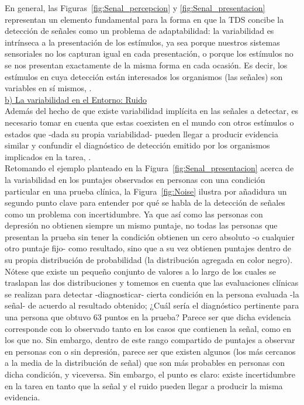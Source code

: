 En general, las Figuras~\ref{fig:Senal_percepcion} y \ref{fig:Senal_presentacion} representan un elemento fundamental para la forma en que la TDS concibe la detección de señales como un problema de adaptabilidad: la variabilidad es intrínseca a la presentación de los estímulos, ya sea porque nuestros sistemas sensoriales no los capturan igual en cada presentación, o porque los estímulos no se nos presentan exactamente de la misma forma en cada ocasión. Es decir, los estímulos en cuya detección están interesados los organismos (las señales) son variables en sí mismos, \parencite{Tanner1954}.\\

    \underline{b) La variabilidad en el Entorno: Ruido}\\

Además del hecho de que existe variabilidad implícita en las señales a detectar, es necesario tomar en cuenta que estas coexisten en el mundo con otros estímulos o estados que -dada su propia variabilidad- pueden llegar a producir evidencia similar y confundir el diagnóstico de detección emitido por los organismos implicados en la tarea, \parencite{Tanner1954}.\\

Retomando el ejemplo planteado en la Figura~\ref{fig:Senal_presentacion} acerca de la variabilidad en los puntajes observados en personas con una condición particular en una prueba clínica, la Figura~\ref{fig:Noise} ilustra por añadidura un segundo punto clave para entender por qué se habla de la detección de señales como un problema con incertidumbre. Ya que así como las personas con depresión no obtienen siempre un mismo puntaje, no todas las personas que presentan la prueba sin tener la condición obtienen un cero absoluto -o cualquier otro puntaje fijo- como resultado, sino que a su vez obtienen puntajes dentro de su propia distribución de probabilidad (la distribución agregada en color negro). Nótese que existe un pequeño conjunto de valores a lo largo de los cuales se traslapan las dos distribuciones y tomemos en cuenta que las evaluaciones clínicas se realizan para detectar -diagnosticar- cierta condición en la persona evaluada -la señal- de acuerdo al resultado obtenido; ¿Cuál sería el diagnóstico pertinente para una persona que obtuvo 63 puntos en la prueba? Parece ser que dicha evidencia corresponde con lo observado tanto en los casos que contienen la señal, como en los que no. Sin embargo, dentro de este rango compartido de puntajes a observar en personas con o sin depresión, parece ser que existen algunos (los más cercanos a la media de la distribución de señal) que son más probables en personas con dicha condición, y viceversa. Sin embargo, el punto es claro: existe incertidumbre en la tarea en tanto que la señal y el ruido pueden llegar a producir la misma evidencia.\\ 

